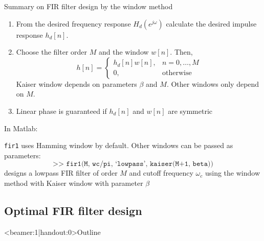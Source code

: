\documentclass[10pt]{beamer}
\begin{document}
%
\begin{frame}{Summary on FIR filter design by the window method}
	\begin{enumerate}
		\item From the desired frequency response $H_d(e^{j\omega})$ calculate the desired impulse response $h_d[n]$.
		\item Choose the filter order $M$ and the window $w[n]$. Then,
		\begin{equation*}
			h[n] = \begin{cases}
			h_d[n]w[n], & n = 0, \ldots, M \\
			0, &\text{otherwise}
			\end{cases} \tag{for $h_d[n]$ causal}
		\end{equation*}
		Kaiser window depends on parameters $\beta$ and $M$. Other windows only depend on $M$.
		
		\item Linear phase is guaranteed if $h_d[n]$ and $w[n]$ are symmetric
	\end{enumerate}

In Matlab: 

\texttt{fir1} uses Hamming window by default. Other windows can be passed as parameters:
\begin{equation*}
\texttt{>> fir1(M, wc/pi, `lowpass', kaiser(M+1, beta))}
\end{equation*} 
designs a lowpass FIR filter of order $M$ and cutoff frequency $\omega_c$ using the window method with Kaiser window with parameter $\beta$
\end{frame}

\subsection{Optimal FIR filter design}
\begin{frame}<beamer:1|handout:0>{Outline}
	\tableofcontents[currentsubsection]
\end{frame}
\end{document}
